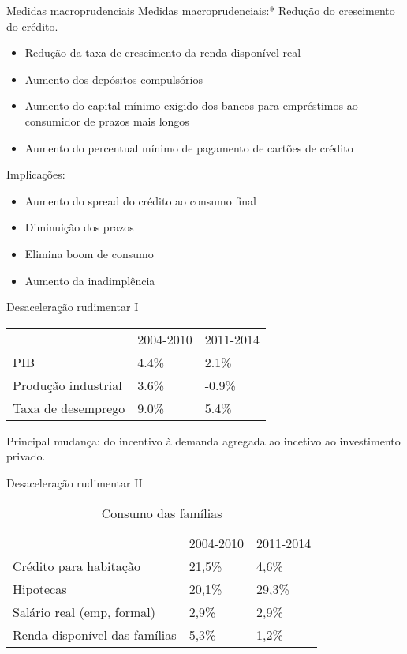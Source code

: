 \documentclass[presentation]{beamer}
\begin{document}
\begin{frame}[label={sec:orgad2fd69}]{Medidas macroprudenciais}
\alert{Medidas macroprudenciais:*} Redução do crescimento do crédito.

\begin{itemize}
\item Redução da taxa de crescimento da renda disponível real
\item Aumento dos depósitos compulsórios
\item Aumento do capital mínimo exigido dos bancos para empréstimos ao consumidor de prazos mais longos
\item Aumento do percentual mínimo de pagamento de cartões de crédito
\end{itemize}

\alert{\alert{Implicações:}}

\begin{itemize}
\item Aumento do spread do crédito ao consumo final
\item Diminuição dos prazos
\item Elimina \alert{boom} de consumo
\item Aumento da inadimplência
\end{itemize}
\end{frame}


\begin{frame}[label={sec:org7387632}]{Desaceleração rudimentar I}
\begin{center}
\begin{tabular}{lll}
\hline
 & 2004-2010 & 2011-2014\\
PIB & 4.4\% & 2.1\%\\
Produção industrial & 3.6\% & -0.9\%\\
Taxa de desemprego & 9.0\% & 5.4\%\\
\hline
\end{tabular}
\end{center}

\alert{Principal mudança:} do incentivo à demanda agregada ao incetivo ao investimento privado.
\end{frame}

\begin{frame}[label={sec:orgb7b260b}]{Desaceleração rudimentar II}
\begin{table}[htbp]
\caption{Consumo das famílias}
\centering
\begin{tabular}{lll}
\hline
 & 2004-2010 & 2011-2014\\
Crédito para habitação & 21,5\% & 4,6\%\\
Hipotecas & 20,1\% & 29,3\%\\
Salário real (emp, formal) & 2,9\% & 2,9\%\\
Renda disponível das famílias & 5,3\% & 1,2\%\\
\hline
\end{tabular}
\end{table}
\end{frame}
\end{document}

